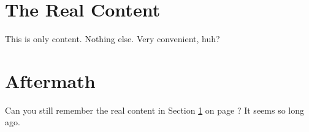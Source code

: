 \section{The Real Content}
\label{sec:real}
This is only content. Nothing else. Very convenient, huh?

\newpage

\section{Aftermath}
\label{sec:after}
Can you still remember the real content in Section \ref{sec:real} on page \pageref{sec:real}? It seems so long ago.